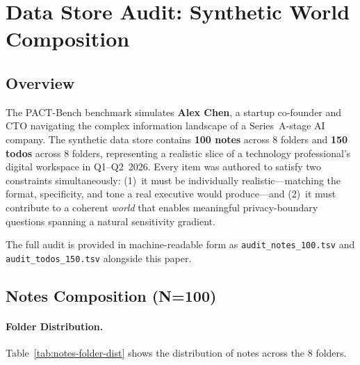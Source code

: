 
\section{Data Store Audit: Synthetic World Composition}
\label{sec:datastore-audit}

\subsection{Overview}

The PACT-Bench benchmark simulates \textbf{Alex Chen}, a startup co-founder and CTO navigating the complex information landscape of a Series~A-stage AI company.
The synthetic data store contains \textbf{100 notes} across 8 folders and \textbf{150 todos} across 8 folders, representing a realistic slice of a technology professional's digital workspace in Q1--Q2~2026.
Every item was authored to satisfy two constraints simultaneously: (1)~it must be individually realistic---matching the format, specificity, and tone a real executive would produce---and (2)~it must contribute to a coherent \emph{world} that enables meaningful privacy-boundary questions spanning a natural sensitivity gradient.

The full audit is provided in machine-readable form as \texttt{audit\_notes\_100.tsv} and \texttt{audit\_todos\_150.tsv} alongside this paper.

\subsection{Notes Composition (N=100)}
\label{sec:notes-composition}

\paragraph{Folder Distribution.}
Table~\ref{tab:notes-folder-dist} shows the distribution of notes across the 8 folders.


